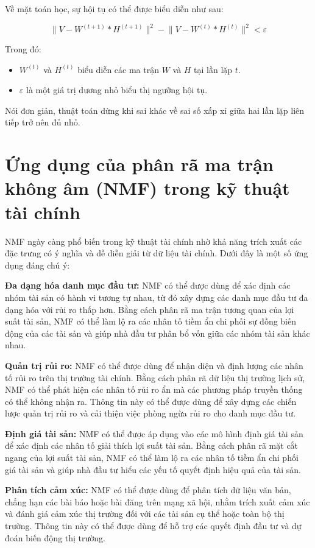 Về mặt toán học, sự hội tụ có thể được biểu diễn như sau:

\[
\lVert V - W^{(t+1)} * H^{(t+1)} \rVert ^2 - \lVert V - W^{(t)} * H^{(t)} \rVert ^2 < \varepsilon
\]

Trong đó:

\begin{itemize}
\item
  \(W^{(t)}\) và \(H^{(t)}\) biểu diễn các ma trận \(W\) và \(H\) tại lần lặp \(t\).
\item
  \(\varepsilon\) là một giá trị dương nhỏ biểu thị ngưỡng hội tụ.
\end{itemize}

Nói đơn giản, thuật toán dừng khi sai khác về sai số xấp xỉ giữa hai lần lặp liên tiếp trở nên đủ nhỏ.

\section{Ứng dụng của phân rã ma trận không âm (NMF) trong kỹ thuật tài chính}

NMF ngày càng phổ biến trong kỹ thuật tài chính nhờ khả năng trích xuất các đặc trưng có ý nghĩa và dễ diễn giải từ dữ liệu tài chính. Dưới đây là một số ứng dụng đáng chú ý:

\textbf{Đa dạng hóa danh mục đầu tư:} NMF có thể được dùng để xác định các nhóm tài sản có hành vi tương tự nhau, từ đó xây dựng các danh mục đầu tư đa dạng hóa với rủi ro thấp hơn. Bằng cách phân rã ma trận tương quan của lợi suất tài sản, NMF có thể làm lộ ra các nhân tố tiềm ẩn chi phối sự đồng biến động của các tài sản và giúp nhà đầu tư phân bổ vốn giữa các nhóm tài sản khác nhau.

\textbf{Quản trị rủi ro:} NMF có thể được dùng để nhận diện và định lượng các nhân tố rủi ro trên thị trường tài chính. Bằng cách phân rã dữ liệu thị trường lịch sử, NMF có thể phát hiện các nhân tố rủi ro ẩn mà các phương pháp truyền thống có thể không nhận ra. Thông tin này có thể được dùng để xây dựng các chiến lược quản trị rủi ro và cải thiện việc phòng ngừa rủi ro cho danh mục đầu tư.

\textbf{Định giá tài sản:} NMF có thể được áp dụng vào các mô hình định giá tài sản để xác định các nhân tố giải thích lợi suất tài sản. Bằng cách phân rã mặt cắt ngang của lợi suất tài sản, NMF có thể làm lộ ra các nhân tố tiềm ẩn chi phối giá tài sản và giúp nhà đầu tư hiểu các yếu tố quyết định hiệu quả của tài sản.

\textbf{Phân tích cảm xúc:} NMF có thể được dùng để phân tích dữ liệu văn bản, chẳng hạn các bài báo hoặc bài đăng trên mạng xã hội, nhằm trích xuất cảm xúc và đánh giá cảm xúc thị trường đối với các tài sản cụ thể hoặc toàn bộ thị trường. Thông tin này có thể được dùng để hỗ trợ các quyết định đầu tư và dự đoán biến động thị trường.

